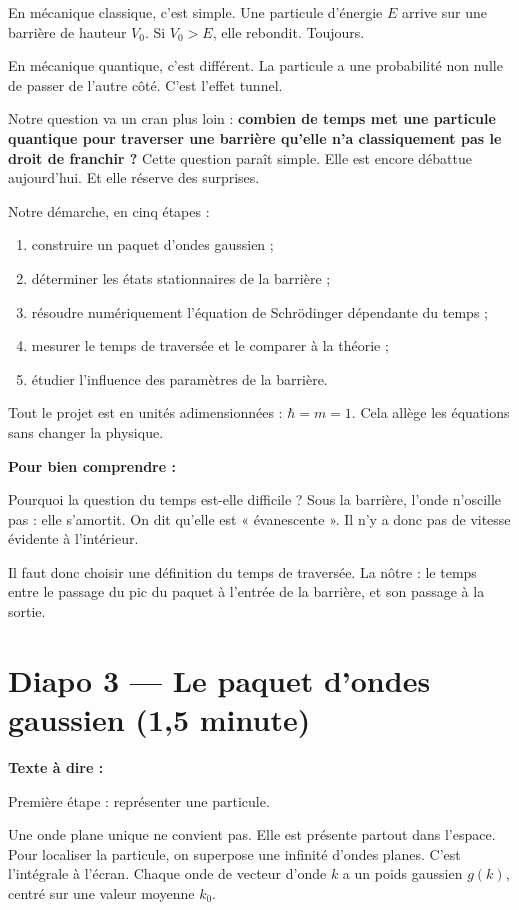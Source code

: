 \documentclass[12pt,a4paper]{article}
\newcommand{\diapo}[2]{\section*{Diapo #1 --- #2}}
\newenvironment{comprendre}%
  {\par\medskip\noindent\hrulefill\par\nopagebreak\textbf{Pour bien comprendre :}\par}%
  {\par\nopagebreak\noindent\hrulefill\par\medskip}
\begin{document}
En mécanique classique, c'est simple.
Une particule d'énergie $E$ arrive sur une barrière de hauteur $V_0$.
Si $V_0 > E$, elle rebondit. Toujours.

En mécanique quantique, c'est différent.
La particule a une probabilité non nulle de passer de l'autre côté.
C'est l'effet tunnel.

Notre question va un cran plus loin :
\textbf{combien de temps met une particule quantique pour traverser
une barrière qu'elle n'a classiquement pas le droit de franchir ?}
Cette question paraît simple.
Elle est encore débattue aujourd'hui.
Et elle réserve des surprises.

Notre démarche, en cinq étapes :

\begin{enumerate}
\item construire un paquet d'ondes gaussien ;
\item déterminer les états stationnaires de la barrière ;
\item résoudre numériquement l'équation de Schrödinger dépendante du temps ;
\item mesurer le temps de traversée et le comparer à la théorie ;
\item étudier l'influence des paramètres de la barrière.
\end{enumerate}

Tout le projet est en unités adimensionnées : $\hbar = m = 1$.
Cela allège les équations sans changer la physique.

\begin{comprendre}
Pourquoi la question du temps est-elle difficile ?
Sous la barrière, l'onde n'oscille pas : elle s'amortit.
On dit qu'elle est « évanescente ».
Il n'y a donc pas de vitesse évidente à l'intérieur.

Il faut donc choisir une définition du temps de traversée.
La nôtre : le temps entre le passage du pic du paquet
à l'entrée de la barrière, et son passage à la sortie.
\end{comprendre}

\clearpage
\diapo{3}{Le paquet d'ondes gaussien (1,5 minute)}

\textbf{Texte à dire :}

Première étape : représenter une particule.

Une onde plane unique ne convient pas.
Elle est présente partout dans l'espace.
Pour localiser la particule, on superpose une infinité d'ondes planes.
C'est l'intégrale à l'écran.
Chaque onde de vecteur d'onde $k$ a un poids gaussien $g(k)$,
centré sur une valeur moyenne $k_0$.
\end{document}
